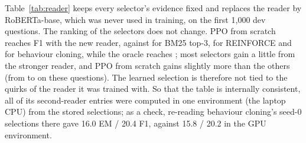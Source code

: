 Table~\ref{tab:reader} keeps every selector's evidence fixed and replaces the reader by RoBERTa-base, which was never used in training, on the first 1{,}000 dev questions. The ranking of the selectors does not change. PPO from scratch reaches \robScratch{} F1 with the new reader, against \robBmThree{} for BM25 top-3, \robReinforce{} for REINFORCE and \robBc{} for behaviour cloning, while the oracle reaches \robOracle{}; most selectors gain a little from the stronger reader, and PPO from scratch gains slightly more than the others (from \miniScratch{} to \robScratch{} on these questions). The learned selection is therefore not tied to the quirks of the reader it was trained with. So that the table is internally consistent, all of its second-reader entries were computed in one environment (the laptop CPU) from the stored selections; as a check, re-reading behaviour cloning's seed-0 selections there gave 16.0 EM / 20.4 F1, against 15.8 / 20.2 in the GPU environment.


